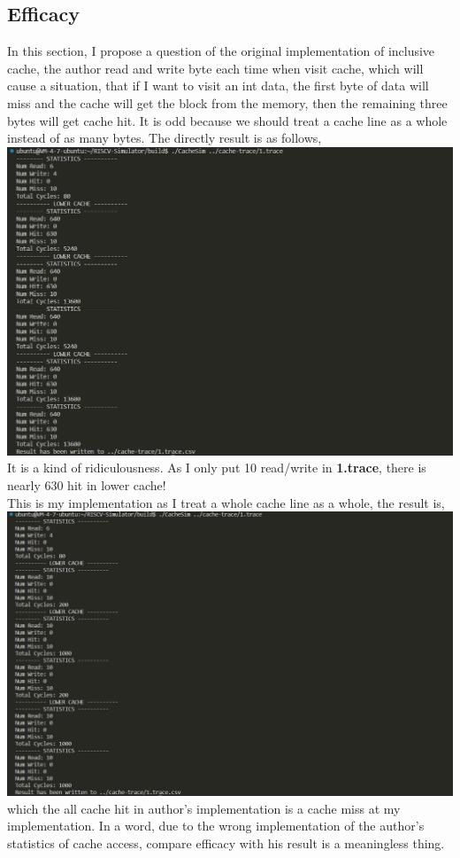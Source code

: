 \documentclass{article}
\begin{document}
\subsection{Efficacy}
In this section, I propose a question of the original implementation of inclusive cache, the author read and write byte each time when visit cache, which will cause a situation, that if I want to visit an int data, the first byte of data will miss and the cache will get the block from the memory, then the remaining three bytes will get cache hit. It is odd because we should treat a cache line as a whole instead of as many bytes. The directly result is as follows,\\
\includegraphics[scale = 0.25]{orignial cache access.png}\\
It is a kind of ridiculousness. As I only put 10 read/write in \textbf{1.trace}, there is nearly 630 hit in lower cache!\\
This is my implementation as I treat a whole cache line as a whole, the result is,\\
\includegraphics[scale = 0.25]{my result.png}\\
which the all cache hit in author's implementation is a cache miss at my implementation. In a word, due to the wrong implementation of the author's statistics of cache access, compare efficacy with his result is a meaningless thing.
\end{document}

